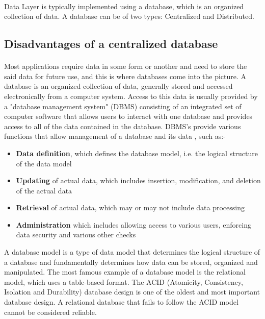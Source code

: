 \documentclass[12pt]{article}
\begin{document}
        \paragraph{}Data Layer is typically implemented using a database, which is an organized collection of data. A database can be of two types: Centralized and Distributed.
        
    \subsection{Disadvantages of a centralized database}
        \paragraph{}
        Most applications require data in some form or another and need to store the said data for future use, and this is where databases come into the picture.
        A database is an organized collection of data, generally stored and accessed electronically from a computer system.
        Access to this data is usually provided by a "database management system" (DBMS) consisting of an integrated set of computer software that allows users to interact with one database and provides access to all of the data contained in the database.
        DBMS's provide various functions that allow management of a database and its data \cite{wikidbms}, such as:-
        \begin{itemize}
            \item \textbf{Data definition}, which defines the database model, i.e. the logical structure of the data model
            \item \textbf{Updating} of actual data, which includes insertion, modification, and deletion of the actual data
            \item \textbf{Retrieval} of actual data, which may or may not include data processing
            \item \textbf{Administration} which includes allowing access to various users, enforcing data security and various other checks
        \end{itemize}
        A database model is a type of data model that determines the logical structure of a database and fundamentally determines how data can be stored, organized and manipulated. The most famous example of a database model is the relational model, which uses a table-based format. The ACID (Atomicity, Consistency, Isolation and Durability) database design is one of the oldest and most important database design. A relational database that fails to follow the ACID model cannot be considered reliable. 
\end{document}
